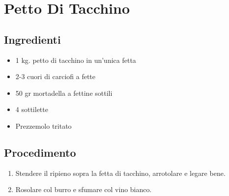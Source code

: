 \section{Petto Di Tacchino }
\subsection{Ingredienti}
\begin{itemize}
\item 1 kg. petto di tacchino in un'unica fetta  
\item 2-3 cuori di carciofi a fette  
\item 50 gr mortadella a fettine sottili  
\item 4 sottilette  
\item Prezzemolo tritato
\end{itemize}
\subsection{Procedimento}
\begin{enumerate}
\item  Stendere il ripieno sopra la fetta di tacchino, arrotolare e legare bene.  
\item  Rosolare col burro e sfumare col vino bianco.
\end{enumerate}
